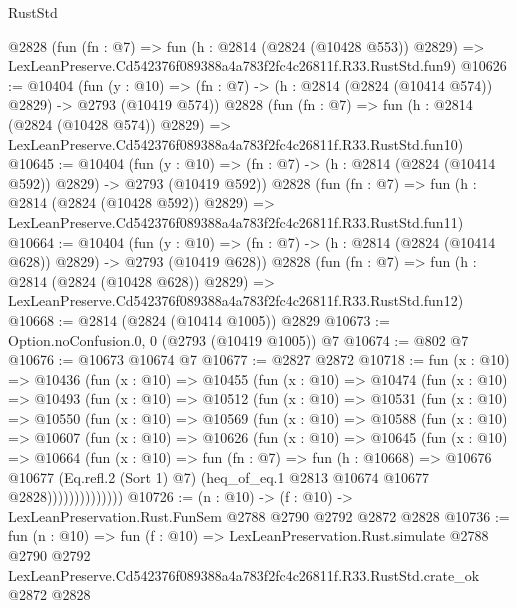 \begin{lexlean}{RustStd}
\begin{coremodule}
    @2828
    (fun (fn : @7) =>
    fun (h : @2814 (@2824 (@10428 @553)) @2829) =>
    LexLeanPreserve.Cd542376f089388a4a783f2fc4c26811f.R33.RustStd.fun9)
@10626 := @10404
    (fun (y : @10) => (fn : @7) -> (h : @2814 (@2824 (@10414 @574)) @2829) -> @2793 (@10419 @574))
    @2828
    (fun (fn : @7) =>
    fun (h : @2814 (@2824 (@10428 @574)) @2829) =>
    LexLeanPreserve.Cd542376f089388a4a783f2fc4c26811f.R33.RustStd.fun10)
@10645 := @10404
    (fun (y : @10) => (fn : @7) -> (h : @2814 (@2824 (@10414 @592)) @2829) -> @2793 (@10419 @592))
    @2828
    (fun (fn : @7) =>
    fun (h : @2814 (@2824 (@10428 @592)) @2829) =>
    LexLeanPreserve.Cd542376f089388a4a783f2fc4c26811f.R33.RustStd.fun11)
@10664 := @10404
    (fun (y : @10) => (fn : @7) -> (h : @2814 (@2824 (@10414 @628)) @2829) -> @2793 (@10419 @628))
    @2828
    (fun (fn : @7) =>
    fun (h : @2814 (@2824 (@10428 @628)) @2829) =>
    LexLeanPreserve.Cd542376f089388a4a783f2fc4c26811f.R33.RustStd.fun12)
@10668 := @2814 (@2824 (@10414 @1005)) @2829
@10673 := Option.noConfusion.{0, 0} (@2793 (@10419 @1005)) @7
@10674 := @802 @7
@10676 := @10673 @10674 @7
@10677 := @2827 @2872
@10718 := fun (x : @10) =>
  @10436
    (fun (x : @10) =>
    @10455
      (fun (x : @10) =>
      @10474
        (fun (x : @10) =>
        @10493
          (fun (x : @10) =>
          @10512
            (fun (x : @10) =>
            @10531
              (fun (x : @10) =>
              @10550
                (fun (x : @10) =>
                @10569
                  (fun (x : @10) =>
                  @10588
                    (fun (x : @10) =>
                    @10607
                      (fun (x : @10) =>
                      @10626
                        (fun (x : @10) =>
                        @10645
                          (fun (x : @10) =>
                          @10664
                            (fun (x : @10) =>
                            fun (fn : @7) =>
                            fun (h : @10668) =>
                            @10676
                              @10677
                              (Eq.refl.{2} (Sort 1) @7)
                              (heq_of_eq.{1} @2813 @10674 @10677 @2828))))))))))))))
@10726 := (n : @10) -> (f : @10) -> LexLeanPreservation.Rust.FunSem @2788 @2790 @2792 @2872 @2828
@10736 := fun (n : @10) =>
  fun (f : @10) =>
  LexLeanPreservation.Rust.simulate
    @2788
    @2790
    @2792
    LexLeanPreserve.Cd542376f089388a4a783f2fc4c26811f.R33.RustStd.crate_ok
    @2872
    @2828
\end{coremodule}
\end{lexlean}
